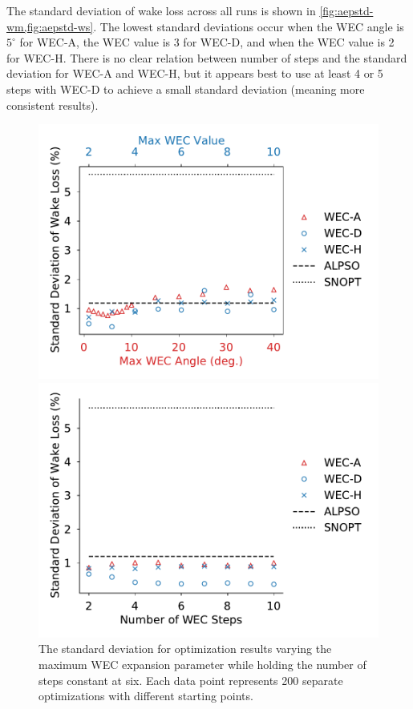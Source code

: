 \documentclass[a4paper]{jpconf}
\begin{document}
The standard deviation of wake loss across all runs is shown in \cref{fig:aepstd-wm,fig:aepstd-ws}. The lowest standard deviations occur when the WEC angle is $5^\circ$ for WEC-A, the WEC value is 3 for WEC-D, and when the WEC value is 2 for WEC-H. There is no clear relation between number of steps and the standard deviation for WEC-A and WEC-H, but it appears best to use at least 4 or 5 steps with WEC-D to achieve a small standard deviation (meaning more consistent results).

\begin{figure}[ht]
	\centering
	\begin{minipage}[t]{0.47\textwidth}
		\centering
		\includegraphics[width=\textwidth, trim={0cm 0cm 0cm 0cm}, clip]{maxwec_const_nsteps6_std}
		\caption{The standard deviation for optimization results varying the maximum WEC expansion parameter while holding the number of steps constant at six. Each data point represents 200 separate optimizations with different starting points.}
		\label{fig:aepstd-wm}
	\end{minipage}\hspace{1pc}
	\begin{minipage}[t]{0.47\textwidth}
		\centering
		\includegraphics[width=\textwidth]{nsteps_const_maxwec_std}

\end{minipage}
\end{figure}
\end{document}
